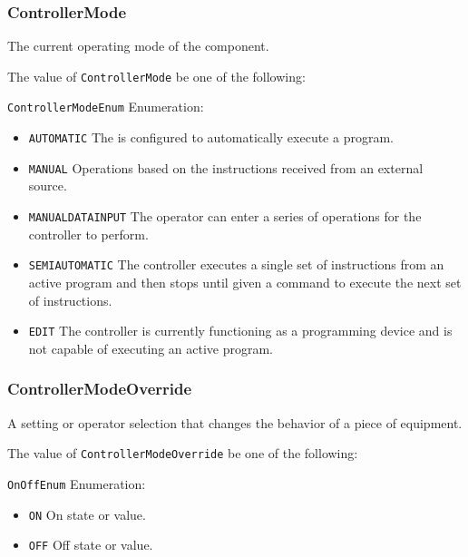 \subsubsection{ControllerMode}
\label{sec:ControllerMode}



The current operating mode of the  component.


The value of \texttt{ControllerMode} \MUST be one of the following: 


\texttt{ControllerModeEnum} Enumeration:

\begin{itemize}
\item \texttt{AUTOMATIC} \newline The  is configured to automatically execute a program. 
\item \texttt{MANUAL} \newline Operations based on the instructions received from an external source. 
\item \texttt{MANUAL\textunderscore DATA\textunderscore INPUT} \newline The operator can enter a series of operations for the controller to perform. 
\item \texttt{SEMI\textunderscore AUTOMATIC} \newline The controller  executes a single set of instructions from an active program and then stops until given a command to execute the next set of instructions. 
\item \texttt{EDIT} \newline The controller is currently functioning as a programming device and is not capable of executing an active program. 
\end{itemize}

\FloatBarrier

\subsubsection{ControllerModeOverride}
\label{sec:ControllerModeOverride}



A setting or operator selection that changes the behavior of a piece of equipment.


The value of \texttt{ControllerModeOverride} \MUST be one of the following: 


\texttt{OnOffEnum} Enumeration:

\begin{itemize}
\item \texttt{ON} \newline On state or value. 
\item \texttt{OFF} \newline Off state or value. 
\end{itemize}

